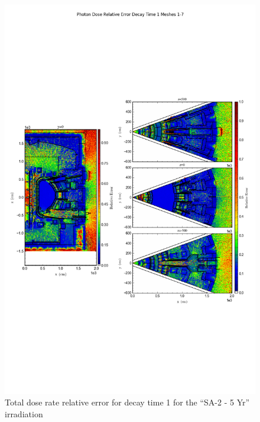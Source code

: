 \documentclass[12pt]{article}
\begin{document}
\begin{figure}[ht!]
\centering
\includegraphics[trim={0cm 8cm, 0cm 8cm},clip,scale=0.75]{../plots/final_model_with_b4c/10year/Photon_Dose_Relative_Error_Decay_Time_1_Meshes_1-7.png}
\caption{Total dose rate relative error for decay time 1 for the ``SA-2 - 5 Yr'' irradiation}
\label{fig:photons_10y_dc1_b4c_relerr}
\end{figure}
\clearpage
\end{document}
